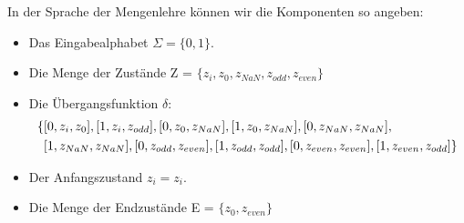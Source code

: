 In der Sprache der Mengenlehre können wir die Komponenten so angeben:
\begin{itemize}
    \item Das Eingabealphabet $\Sigma = \{0,1\}$.
    \item Die Menge der Zustände Z = $\{z_i, z_0, z_{NaN}, z_{odd}, z_{even}\}$
    \item Die Übergangsfunktion $\delta$:
    \begin{align*} \{
     &  [0, z_i, z_0],
        [1, z_i, z_{odd}],
        [0, z_0, z_{NaN}],
        [1, z_0, z_{NaN}],
        [0, z_{NaN}, z_{NaN}], \notag\\
     &  [1, z_{NaN}, z_{NaN}],
        [0, z_{odd}, z_{even}],
        [1, z_{odd}, z_{odd}],
        [0, z_{even}, z_{even}],
        [1, z_{even}, z_{odd}] \notag
    \} \end{align*}
    \item Der Anfangszustand $z_i = z_i$.
    \item Die Menge der Endzustände E = $\{z_0, z_{even}\}$ 
\end{itemize}

